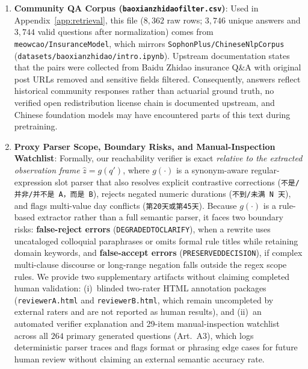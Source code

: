 \documentclass[10pt,twocolumn]{article}
\renewcommand{\_}{\textunderscore\allowbreak}
\begin{document}
\begin{enumerate}[leftmargin=*,nosep]
  \item \textbf{Community QA Corpus (\texttt{baoxianzhidao\_filter.csv})}: Used in Appendix~\ref{app:retrieval}, this file ($8{,}362$ raw rows; $3{,}746$ unique answers and $3{,}744$ valid questions after normalization) comes from \texttt{meowcao/InsuranceModel}, which mirrors \texttt{SophonPlus/ChineseNlpCorpus} (\texttt{datasets/\allowbreak baoxianzhidao/intro.ipynb}). Upstream documentation states that the pairs were collected from Baidu Zhidao insurance Q\&A with original post URLs removed and sensitive fields filtered. Consequently, answers reflect historical community responses rather than actuarial ground truth, no verified open redistribution license chain is documented upstream, and Chinese foundation models may have encountered parts of this text during pretraining.
  \item \textbf{Proxy Parser Scope, Boundary Risks, and Manual-Inspection Watchlist}: Formally, our reachability verifier is exact \emph{relative to the extracted observation frame} $\hat{z} = g(q')$, where $g(\cdot)$ is a synonym-aware regular-expression slot parser that also resolves explicit contrastive corrections (\texttt{不是/并非/并不是 A，而是 B}), rejects negated numeric durations (\texttt{不到/未满 N 天}), and flags multi-value day conflicts (\texttt{第20天或第45天}). Because $g(\cdot)$ is a rule-based extractor rather than a full semantic parser, it faces two boundary risks: \textbf{false-reject errors} (\texttt{DEGRADED\_TO\_CLARIFY}), when a rewrite uses uncataloged colloquial paraphrases or omits formal rule titles while retaining domain keywords, and \textbf{false-accept errors} (\texttt{PRESERVED\_DECISION}), if complex multi-clause discourse or long-range negation falls outside the regex scope rules. We provide two supplementary artifacts without claiming completed human validation: (i)~blinded two-rater HTML annotation packages (\texttt{reviewer\_A.html} and \texttt{reviewer\_B.html}, which remain uncompleted by external raters and are not reported as human results), and (ii)~an automated verifier explanation and 29-item manual-inspection watchlist across all $264$ primary generated questions (Art.~A3), which logs deterministic parser traces and flags format or phrasing edge cases for future human review without claiming an external semantic accuracy rate.
\end{enumerate}
\end{document}
